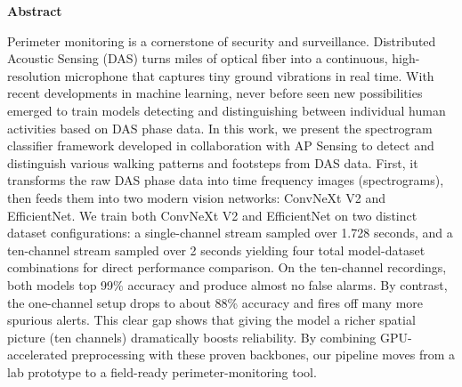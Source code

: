 %
%






\begin{Large}
\textsf{\textbf{Abstract}}\\
\end{Large}


Perimeter monitoring is a cornerstone of security and surveillance. Distributed Acoustic Sensing (DAS) turns miles of optical fiber into a continuous, high-resolution microphone that captures tiny ground vibrations in real time. With recent developments in machine learning, never before seen new possibilities emerged to train models detecting and distinguishing between individual human activities based on DAS phase data. In this work, we present the spectrogram classifier framework developed in collaboration with AP Sensing to detect and distinguish various walking patterns and footsteps from DAS data. First, it transforms the raw DAS phase data into  time frequency images (spectrograms), then feeds them into two modern vision networks: ConvNeXt V2 and EfficientNet. We train both ConvNeXt V2 and EfficientNet on two distinct dataset configurations: a single-channel stream sampled over 1.728 seconds, and a ten-channel stream sampled over 2 seconds yielding four total model-dataset combinations for direct performance comparison. On the ten-channel recordings, both models top 99\% accuracy and produce almost no false alarms. By contrast, the one-channel setup drops to about 88\% accuracy and fires off many more spurious alerts. This clear gap shows that giving the model a richer spatial picture (ten channels) dramatically boosts reliability. By combining GPU-accelerated preprocessing with these proven backbones, our pipeline moves from a lab prototype to a field-ready perimeter-monitoring tool.



